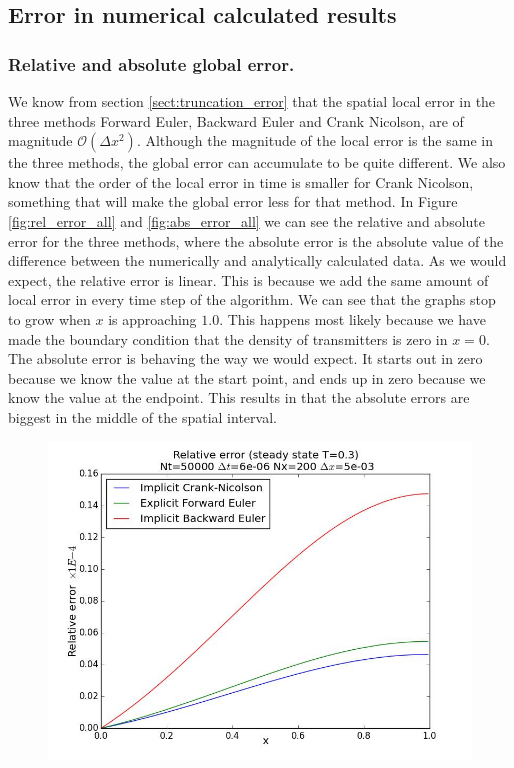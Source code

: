 \documentclass[12pt]{article}
\begin{document}
\begin{flushleft}
\newpage
\subsection{Error in numerical calculated results}
\subsubsection{Relative and absolute global error.}
We know from section \ref{sect:truncation_error} that the spatial local error in the three methods Forward Euler, Backward Euler and Crank Nicolson, are of magnitude $\mathcal{O}(\Delta x^2)$. Although the magnitude of the local error is the same in the three methods, the global error can accumulate to be quite different. We also know that the order of the local error in time is smaller for Crank Nicolson, something that will make the global error less for that method. In Figure \ref{fig:rel_error_all} and \ref{fig:abs_error_all} we can see the relative and absolute error for the three methods, where the absolute error is the absolute value of the difference between the numerically and analytically calculated data. As we would expect, the relative error is linear. This is because we add the same amount of local error in every time step of the algorithm. We can see that the graphs stop to grow when $x$ is approaching $1.0$. This happens most likely because we have made the boundary condition that the density of transmitters is zero in $x=0$. The absolute error is behaving the way we would expect. It starts out in zero because we know the value at the start point, and ends up in zero because we know the value at the endpoint. This results in that the absolute errors are biggest in the middle of the spatial interval.
\begin{figure}[!h]
  \begin{minipage}{\linewidth}
    \centering
    {\includegraphics[scale=0.27]{rel_error_all}}

\end{minipage}
\end{figure}
\end{flushleft}
\end{document}
